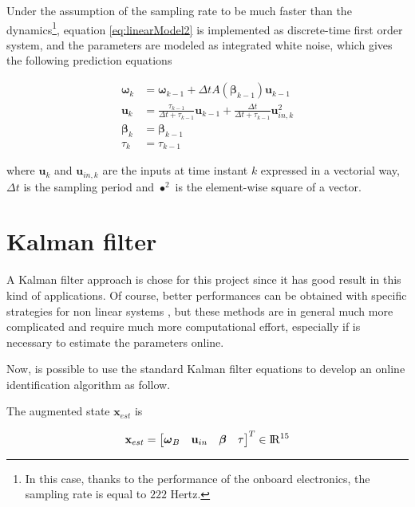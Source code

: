 \noindent Under the assumption of the sampling rate to be much faster than the dynamics\footnote{In this case, thanks to the performance of the onboard electronics, the sampling rate is equal to $222$ Hertz.}, equation \eqref{eq:linearModel2} is implemented as discrete-time first order system, and the parameters are modeled as integrated white noise, which gives the following prediction equations

\begin{align}
	\boldsymbol{\omega}_{k} &= \boldsymbol{\omega}_{k-1}+\Delta t A(\boldsymbol{\beta}_{k-1})\mathbf{u}_{k-1} \\
    \mathbf{u}_k &= \frac{\tau_{k-1}}{\Delta t+\tau_{k-1}}\mathbf{u}_{k-1}+\frac{\Delta t}{\Delta t+\tau_{k-1}}\mathbf{u}_{in,k}^2 \\
    \boldsymbol{\beta}_k &= \boldsymbol{\beta}_{k-1} \\
    \tau_k &= \tau_{k-1}
\end{align}

\noindent where $\mathbf{u}_k$ and $\mathbf{u}_{in,k}$ are the inputs at time instant $k$ expressed in a vectorial way, $\Delta t$ is the sampling period and $\bullet^2$ is the element-wise square of a vector.


\section{Kalman filter}
\label{KalmanFilter}

A Kalman filter approach is chose for this project since it has good result in this kind of applications. Of course, better performances can be obtained with specific strategies for non linear systems \cite{parameterIdentification}, but these methods are in general much more complicated and require much more computational effort, especially if is necessary to estimate the parameters online.  

\noindent Now, is possible to use the standard Kalman filter equations \cite{KalmanFilter} to develop an online identification algorithm as follow.

\noindent The augmented state $\mathbf{x}_{est}$ is

\begin{equation}
	\mathbf{x}_{est}=
	\begin{bmatrix}
		\boldsymbol{\omega}_B & \mathbf{u}_{in} & \boldsymbol{\beta} & \tau
	\end{bmatrix}^T
	\in \rm I\!R^{15}
	\label{eq:augmentedState}
\end{equation} 

